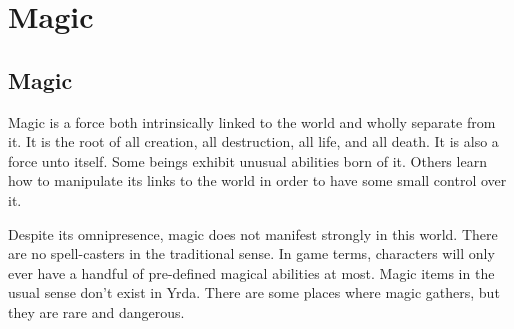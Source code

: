 \chapter{Magic}

\begin{multicols}{2}

\section{Magic}

Magic is a force both intrinsically linked to the world and wholly separate from it. It is
the root of all creation, all destruction, all life, and all death. It is also a force unto
itself. Some beings exhibit unusual abilities born of it. Others learn how to manipulate its
links to the world in order to have some small control over it.

Despite its omnipresence, magic does not manifest strongly in this world. There are no
spell-casters in the traditional sense. In game terms, characters will only ever have
a handful of pre-defined magical abilities at most. Magic items in the usual sense don't
exist in Yrda. There are some places where magic gathers, but they are rare and dangerous.

\end{multicols}
